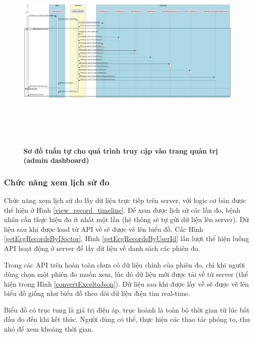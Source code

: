 \begin{figure}[H]
  \centering
  \includegraphics[width=16cm,height=10cm]{Images/server/sequence/web/seq_auth.png}
  \caption[Sơ đồ tuần tự cho quá trình truy cập vào trang quản trị (admin dashboard) ]{\bfseries \fontsize{12pt}{0pt}
  \selectfont Sơ đồ tuần tự cho quá trình truy cập vào trang quản trị (admin dashboard) }
  \label{seq_auth} %
\end{figure}


\subsubsection{Chức năng xem lịch sử đo}
\label{function_view_history_record}


Chức năng xem lịch sử đo lấy dữ liệu trực tiếp trên server, với logic cơ bản được thể hiện ở Hình \ref{view_record_timeline}. 
Để xem được lịch sử các lần đo, bệnh nhân cần thực hiện đo ít nhất một lần (hệ thống sẽ tự gửi dữ liệu lên server). Dữ liệu sau khi được
load từ API về sẽ được vẽ lên biểu đồ. Các Hình \ref{getEcgRecordsByDoctor}, Hình \ref{getEcgRecordsByUserId}
lần lượt thể hiện luồng API hoạt động ở server để lấy dữ liệu về danh sách các phiên đo. 

Trong các API trên hoàn toàn chưa có dữ liệu chính của phiên đo, chỉ khi người dùng chọn một phiên đo muốn xem, lúc đó dữ liệu
mới được tải về từ server (thể hiện trong Hình \ref{convertExceltoJson}). Dữ liệu sau khi được lấy về sẽ được vẽ lên biểu đồ giống
như biểu đồ theo dõi dữ liệu điện tim real-time.

Biểu đồ có trục tung là giá trị điện áp, trục hoành là toàn bộ thời gian từ lúc bắt đầu đo đến khi kết thúc. Người dùng có thể,
thực hiện các thao tác phóng to, thu nhỏ để xem khoảng thời gian.

